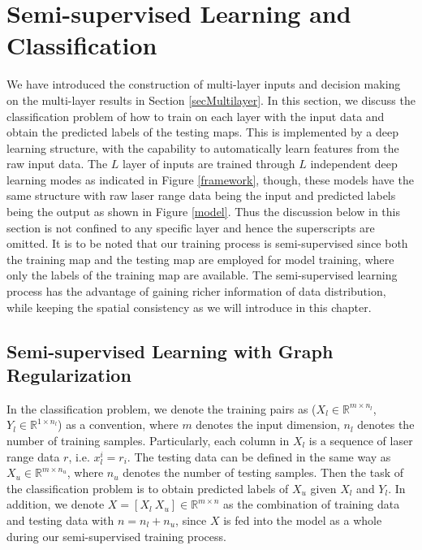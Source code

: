 \documentclass[letterpaper, 10 pt, conference]{ieeeconf}  %
\begin{document}

\section{Semi-supervised Learning and Classification} \label{secSemi}

We have introduced the construction of multi-layer inputs and decision making on the multi-layer results in Section \ref{secMultilayer}. In this section, we discuss the classification problem of how to train on each layer with the input data and obtain the predicted labels of the testing maps. This is implemented by a deep learning structure, with the capability to automatically learn features from the raw input data. The $L$ layer of inputs are trained through $L$ independent deep learning modes as indicated in Figure \ref{framework}, though, these models have the same structure with raw laser range data being the input and predicted labels being the output as shown in Figure \ref{model}. Thus the discussion below in this section is not confined to any specific layer and hence the superscripts are omitted. It is to be noted that our training process is semi-supervised since both the training map and the testing map are employed for model training, where only the labels of the training map are available. The semi-supervised learning process has the advantage of gaining richer information of data distribution, while keeping the spatial consistency as we will introduce in this chapter.


\subsection{Semi-supervised Learning with Graph Regularization}
In the classification problem, we denote the training  pairs as ($X_l\in\mathbb{R}^{m\times n_l}$, $Y_l\in\mathbb{R}^{1\times n_l}$) as a convention, where $m$ denotes the input dimension, $n_l$ denotes the number of training samples. Particularly, each column in $X_l$ is a sequence of laser range data $r$, i.e. $x_l^i=r_i$. The testing data can be defined in the same way as $X_u\in\mathbb{R}^{m\times n_u}$, where $n_u$ denotes the number of testing samples. Then the task of the classification problem is to obtain predicted labels of $X_u$ given $X_l$ and $Y_l$. In addition, we denote $X=[X_l~X_u]\in\mathbb{R}^{m\times n}$ as the combination of training data and testing data with $n=n_l+n_u$, since $X$ is fed into the model as a whole during our semi-supervised training process.
\end{document}
